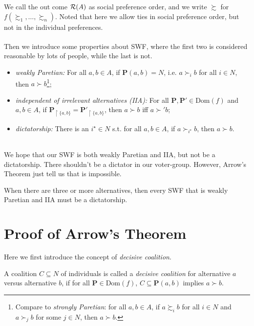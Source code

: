 We call the out come $\mathcal{R}(A)$ as social preference order, and we write $\succsim$ for $f(\succsim_1,\dots, \succsim_n)$. Noted that here we allow ties in social preference order, but not in the individual preferences.\\
~\\
Then we introduce some properties about SWF, where the first two is considered reasonable by lots of people, while the last is not.

\begin{itemize}
    \item \textit{weakly Paretian:} For all $a,b \in A$, if $\mathbf{P}(a,b) = N$, i.e. $a \succ_i b$ for all $i \in N$, then $a \succ b$\footnote{Compare to \emph{strongly Paretian}: for all $a,b\in A$, if $a\succsim_i b$ for all $i\in N$ and $a \succ_j b$ for some $j\in N$, then $a \succ b$.};
    \item \textit{independent of irrelevant alternatives (IIA):} For all $\mathbf{P},\mathbf{P'} \in \mathrm{Dom}(f)$ and $a ,b \in A$, if $\mathbf{P}_{\upharpoonright\{a,b\}} = \mathbf{P'}_{\upharpoonright\{a,b\}}$, then $a \succ b$ iff $a \succ' b$;
    \item \textit{dictatorship:} There is an $i^\star \in N$ s.t. for all $a,b \in A$, if $a \succ_{i^\star} b$, then $a \succ b$.
\end{itemize}
~\\
We hope that our SWF is both weakly Paretian and IIA, but not be a dictatorship. There shouldn't be a dictator in our voter-group. However, Arrow's Theorem just tell us that is impossible.

\begin{theorem}
    When there are three or more alternatives, then every SWF that is weakly Paretian and IIA must be a dictatorship.
\end{theorem}

\section{Proof of Arrow's Theorem}

Here we first introduce the concept of \textit{decisive coalition}.

\begin{definition}
    A coalition $C \subseteq N$ of individuals is called a \textit{decisive coalition} for alternative $a$ versus alternative $b$, if for all $\mathbf{P} \in \mathrm{Dom}(f)$, $C \subseteq \mathbf{P}(a,b)$ implies $a \succ b$.
\end{definition}

